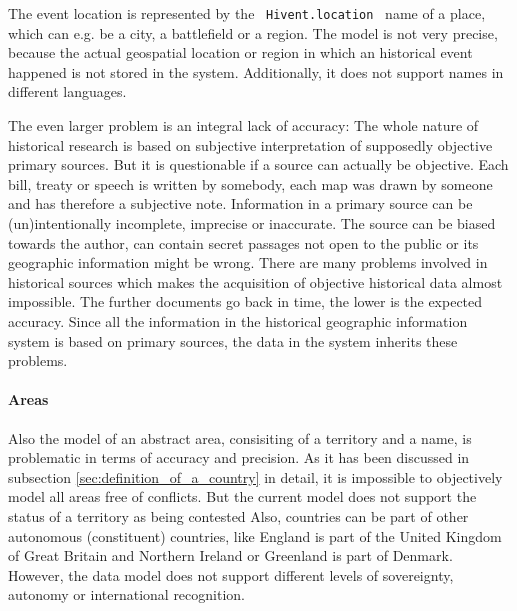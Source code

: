 The event location is represented by the ~\texttt{Hivent.location}~ name of a place, which can e.g. be a city, a battlefield or a region. The model is not very precise, because the actual geospatial location or region in which an historical event happened is not stored in the system. Additionally, it does not support names in different languages.

The even larger problem is an integral lack of accuracy: The whole nature of historical research is based on subjective interpretation of supposedly objective primary sources. But it is questionable if a source can actually be objective. Each bill, treaty or speech is written by somebody, each map was drawn by someone and has therefore a subjective note. Information in a primary source can be (un)intentionally incomplete, imprecise or inaccurate. The source can be biased towards the author, can contain secret passages not open to the public or its geographic information might be wrong. There are many problems involved in historical sources which makes the acquisition of objective historical data almost impossible. The further documents go back in time, the lower is the expected accuracy. Since all the information in the historical geographic information system is based on primary sources, the data in the system inherits these problems.


\paragraph{Areas} %
\label{par:evaluation_areas}

Also the model of an abstract area, consisiting of a territory and a name, is problematic in terms of accuracy and precision. As it has been discussed in subsection \ref{sec:definition_of_a_country} in detail, it is impossible to objectively model all areas free of conflicts. But the current model does not support the status of a territory as being contested Also, countries can be part of other autonomous (constituent) countries, like England is part of the United Kingdom of Great Britain and Northern Ireland or Greenland is part of Denmark. However, the data model does not support different levels of sovereignty, autonomy or international recognition.

